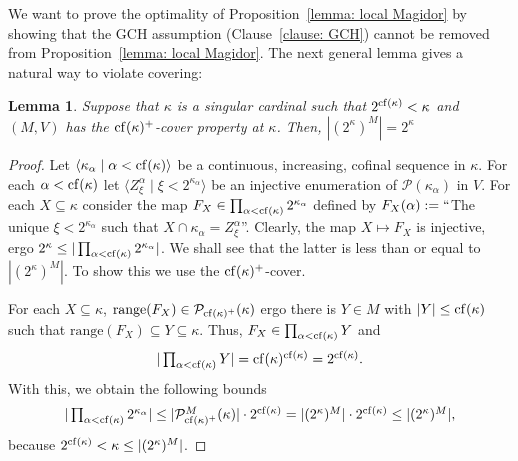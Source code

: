 \documentclass[11pt]{amsart}
\newtheorem{lemma}[theorem]{Lemma}
\theoremstyle{definition}
\theoremstyle{remark}
\newcommand{\cf}{{\rm cf}}
\def\s{\subseteq}
\begin{document}
We want to prove the optimality of Proposition~\ref{lemma: local Magidor} by showing that the GCH assumption (Clause~\eqref{clause: GCH}) cannot be removed from Proposition~\ref{lemma: local Magidor}. The next general lemma gives a natural way to violate covering:
\begin{lemma}\label{lemma: cover}
    Suppose that $\kappa$ is a singular cardinal such that $2^{\cf(\kappa)} < \kappa$ and $(M, V)$ has the $\cf(\kappa)^+$-cover property at $\kappa$. Then, $|(2^\kappa)^{M}|=2^\kappa$
\end{lemma}
\begin{proof}
Let $\langle \kappa_\alpha\mid \alpha < \cf(\kappa)\rangle$ be a continuous, increasing, cofinal sequence in $\kappa$. For each $\alpha <\cf(\kappa)$ let $\langle Z^\alpha_\xi\mid \xi < 2^{\kappa_\alpha}\rangle$ be an injective enumeration of $\mathcal{P}(\kappa_\alpha)$ in $V$.   For each $X\s \kappa$ consider the map $F_X\in \prod_{\alpha < \cf(\kappa)}2^{\kappa_\alpha}$ defined by $F_X(\alpha):=``$The unique $\xi<2^{\kappa_\alpha}$ such that $X\cap \kappa_\alpha = Z^\alpha_\xi$''. Clearly, the map $X\mapsto F_X$ is injective, ergo $2^\kappa\leq |\prod_{\alpha < \cf(\kappa)} 2^{\kappa_\alpha}|$. We shall see that the latter is less than or equal to $|(2^\kappa)^{M}|$. To show this we use the $\cf(\kappa)^+$-cover.

For each $X\s\kappa$, $\mathrm{range}(F_X)\in \mathcal{P}_{\cf(\kappa)^+}(\kappa)$ ergo there is $Y\in M$ with $|Y|\leq \cf(\kappa)$ such that $\mathrm{range}(F_X)\s Y\s \kappa$. Thus, $F_X\in \prod_{\alpha <\cf(\kappa)} Y$ and $$\textstyle |\prod_{\alpha <\cf(\kappa)} Y|=\cf(\kappa)^{\cf(\kappa)}=2^{\cf(\kappa)}.$$
With this, we obtain the following bounds
$$\textstyle |\prod_{\alpha < \cf(\kappa)} 2^{\kappa_\alpha}|\leq |\mathcal{P}_{\cf(\kappa)^+}^{M}(\kappa)|\cdot 2^{\cf(\kappa)} = |(2^\kappa)^{M}|\cdot 2^{\cf(\kappa)}\leq  |(2^\kappa)^{M}|,$$
because $2^{\cf(\kappa)} < \kappa \leq |(2^\kappa)^{M}|$.
\end{proof}
\end{document}
